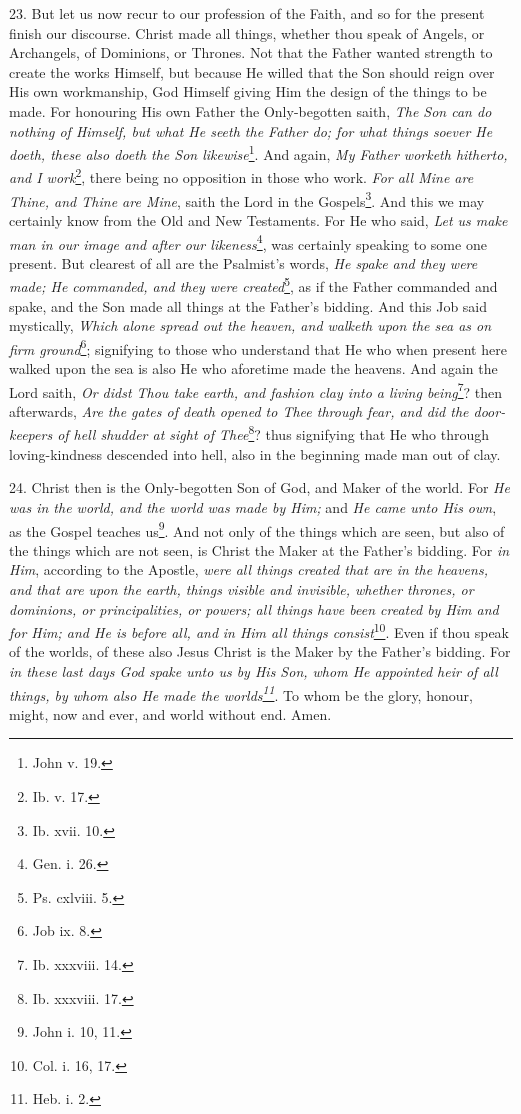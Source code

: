 23. But let us now recur to our profession of the Faith, and so for the present finish our discourse. Christ made all things, whether thou speak of Angels, or Archangels, of Dominions, or Thrones. Not that the Father wanted strength to create the works Himself, but because He willed that the Son should reign over His own workmanship, God Himself giving Him the design of the things to be made. For honouring His own Father the Only-begotten saith, \emph{The Son can do nothing of Himself, but what He seeth the Father do; for what things soever He doeth, these also doeth the Son likewise}\footnote{John v. 19.}. And again, \emph{My Father worketh hitherto, and I work}\footnote{Ib. v. 17.}, there being no opposition in those who work. \emph{For all Mine are Thine, and Thine are Mine}, saith the Lord in the Gospels\footnote{Ib. xvii. 10.}. And this we may certainly know from the Old and New Testaments. For He who said, \emph{Let us make man in our image and after our likeness}\footnote{Gen. i. 26.}, was certainly speaking to some one present. But clearest of all are the Psalmist’s words, \emph{He spake and they were made; He commanded, and they were created}\footnote{Ps. cxlviii. 5.}, as if the Father commanded and spake, and the Son made all things at the Father’s bidding. And this Job said mystically, \emph{Which alone spread out the heaven, and walketh upon the sea as on firm ground}\footnote{Job ix. 8.}; signifying to those who understand that He who when present here walked upon the sea is also He who aforetime made the heavens. And again the Lord saith, \emph{Or didst Thou take earth, and fashion clay into a living being}\footnote{Ib. xxxviii. 14.}? then afterwards, \emph{Are the gates of death opened to Thee through fear, and did the door-keepers of hell shudder at sight of Thee}\footnote{Ib. xxxviii. 17.}? thus signifying that He who through loving-kindness descended into hell, also in the beginning made man out of clay.

24. Christ then is the Only-begotten Son of God, and Maker of the world. For \emph{He was in the world, and the world was made by Him;} and \emph{He came unto His own}, as the Gospel teaches us\footnote{John i. 10, 11.}. And not only of the things which are seen, but also of the things which are not seen, is Christ the Maker at the Father’s bidding. For \emph{in Him}, according to the Apostle, \emph{were all things created that are in the heavens, and that are upon the earth, things visible and invisible, whether thrones, or dominions, or principalities, or powers; all things have been created by Him and for Him; and He is before all, and} \emph{in Him all things consist}\footnote{Col. i. 16, 17.}. Even if thou speak of the worlds, of these also Jesus Christ is the Maker by the Father’s bidding. For \emph{in these last days God spake unto us by His Son, whom He appointed heir of all things, by whom also He made the worlds\footnote{Heb. i. 2.}}. To whom be the glory, honour, might, now and ever, and world without end. Amen.


